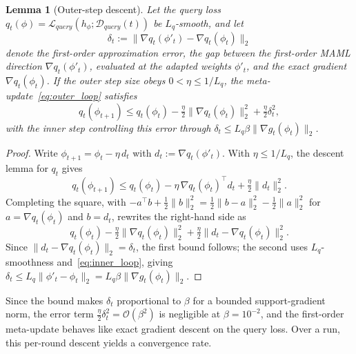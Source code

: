\documentclass[journal]{IEEEtran}
\newtheorem{Lemma}{Lemma}
\begin{document}
{\color{black}
\begin{Lemma}[Outer-step descent]\label{stmt:outer}
Let the query loss $q_t(\phi)=\mathcal{L}_{query}(h_\phi;\mathcal{D}_{query}(t))$ be $L_q$-smooth, and let
\[
\delta_t:=\lVert\nabla q_t(\phi'_t)-\nabla q_t(\phi_t)\rVert_2
\]
denote the first-order approximation error, the gap between the first-order MAML direction $\nabla q_t(\phi'_t)$, evaluated at the adapted weights $\phi'_t$, and the exact gradient $\nabla q_t(\phi_t)$. If the outer step size obeys $0<\eta\le 1/L_q$, the meta-update~\eqref{eq:outer_loop} satisfies
\[
q_t(\phi_{t+1})\le q_t(\phi_t)-\tfrac{\eta}{2}\lVert\nabla q_t(\phi_t)\rVert_2^2+\tfrac{\eta}{2}\delta_t^2 ,
\]
with the inner step controlling this error through $\delta_t\le L_q\beta\lVert\nabla g_t(\phi_t)\rVert_2$.
\end{Lemma}
\begin{proof}
Write $\phi_{t+1}=\phi_t-\eta\,d_t$ with $d_t:=\nabla q_t(\phi'_t)$. With $\eta\le 1/L_q$, the descent lemma for $q_t$ gives
\[
q_t(\phi_{t+1})\le q_t(\phi_t)-\eta\,\nabla q_t(\phi_t)^{\top}d_t+\tfrac{\eta}{2}\lVert d_t\rVert_2^2 .
\]
Completing the square, with $-a^{\top}b+\tfrac12\lVert b\rVert_2^2=\tfrac12\lVert b-a\rVert_2^2-\tfrac12\lVert a\rVert_2^2$ for $a=\nabla q_t(\phi_t)$ and $b=d_t$, rewrites the right-hand side as
\[
q_t(\phi_t)-\tfrac{\eta}{2}\lVert\nabla q_t(\phi_t)\rVert_2^2+\tfrac{\eta}{2}\lVert d_t-\nabla q_t(\phi_t)\rVert_2^2 .
\]
Since $\lVert d_t-\nabla q_t(\phi_t)\rVert_2=\delta_t$, the first bound follows; the second uses $L_q$-smoothness and~\eqref{eq:inner_loop}, giving $\delta_t\le L_q\lVert\phi'_t-\phi_t\rVert_2=L_q\beta\lVert\nabla g_t(\phi_t)\rVert_2$.
\end{proof}
Since the bound makes $\delta_t$ proportional to $\beta$ for a bounded support-gradient norm, the error term $\tfrac{\eta}{2}\delta_t^2=\mathcal{O}(\beta^2)$ is negligible at $\beta=10^{-2}$, and the first-order meta-update behaves like exact gradient descent on the query loss. Over a run, this per-round descent yields a convergence rate.

}
\end{document}
